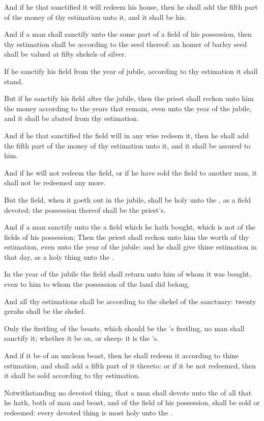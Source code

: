 \Verse And if he that sanctified it will redeem his house, then he shall add the fifth part of the money of thy estimation unto it, and it shall be his.

\Verse And if a man shall sanctify unto the \LORD some part of a field of his possession, then thy estimation shall be according to the seed thereof: an homer of barley seed shall be valued at fifty shekels of silver.

\Verse If he sanctify his field from the year of jubile, according to thy estimation it shall stand.

\Verse But if he sanctify his field after the jubile, then the priest shall reckon unto him the money according to the years that remain, even unto the year of the jubile, and it shall be abated from thy estimation.

\Verse And if he that sanctified the field will in any wise redeem it, then he shall add the fifth part of the money of thy estimation unto it, and it shall be assured to him.

\Verse And if he will not redeem the field, or if he have sold the field to another man, it shall not be redeemed any more.

\Verse But the field, when it goeth out in the jubile, shall be holy unto the \LORD, as a field devoted; the possession thereof shall be the priest's.

\Verse And if a man sanctify unto the \LORD a field which he hath bought, which is not of the fields of his possession; \Verse Then the priest shall reckon unto him the worth of thy estimation, even unto the year of the jubile: and he shall give thine estimation in that day, as a holy thing unto the \LORD.

\Verse In the year of the jubile the field shall return unto him of whom it was bought, even to him to whom the possession of the land did belong.

\Verse And all thy estimations shall be according to the shekel of the sanctuary: twenty gerahs shall be the shekel.

\Verse Only the firstling of the beasts, which should be the \LORD's firstling, no man shall sanctify it; whether it be ox, or sheep: it is the \LORD's.

\Verse And if it be of an unclean beast, then he shall redeem it according to thine estimation, and shall add a fifth part of it thereto: or if it be not redeemed, then it shall be sold according to thy estimation.

\Verse Notwithstanding no devoted thing, that a man shall devote unto the \LORD of all that he hath, both of man and beast, and of the field of his possession, shall be sold or redeemed: every devoted thing is most holy unto the \LORD.

